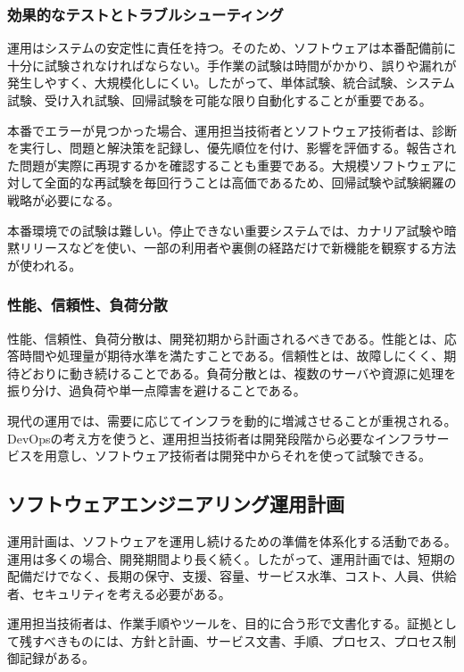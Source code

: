 \documentclass[a4paper,11pt]{ltjsarticle}
\numberwithin{figure}{section}
\numberwithin{table}{section}
\begin{document}
\subsubsection{効果的なテストとトラブルシューティング}

運用はシステムの安定性に責任を持つ。そのため、ソフトウェアは本番配備前に十分に試験されなければならない。手作業の試験は時間がかかり、誤りや漏れが発生しやすく、大規模化しにくい。したがって、単体試験、統合試験、システム試験、受け入れ試験、回帰試験を可能な限り自動化することが重要である。

本番でエラーが見つかった場合、運用担当技術者とソフトウェア技術者は、診断を実行し、問題と解決策を記録し、優先順位を付け、影響を評価する。報告された問題が実際に再現するかを確認することも重要である。大規模ソフトウェアに対して全面的な再試験を毎回行うことは高価であるため、回帰試験や試験網羅の戦略が必要になる。

本番環境での試験は難しい。停止できない重要システムでは、カナリア試験や暗黙リリースなどを使い、一部の利用者や裏側の経路だけで新機能を観察する方法が使われる。

\subsubsection{性能、信頼性、負荷分散}

性能、信頼性、負荷分散は、開発初期から計画されるべきである。性能とは、応答時間や処理量が期待水準を満たすことである。信頼性とは、故障しにくく、期待どおりに動き続けることである。負荷分散とは、複数のサーバや資源に処理を振り分け、過負荷や単一点障害を避けることである。

現代の運用では、需要に応じてインフラを動的に増減させることが重視される。DevOpsの考え方を使うと、運用担当技術者は開発段階から必要なインフラサービスを用意し、ソフトウェア技術者は開発中からそれを使って試験できる。

\subsection{ソフトウェアエンジニアリング運用計画}

運用計画は、ソフトウェアを運用し続けるための準備を体系化する活動である。運用は多くの場合、開発期間より長く続く。したがって、運用計画では、短期の配備だけでなく、長期の保守、支援、容量、サービス水準、コスト、人員、供給者、セキュリティを考える必要がある。

運用担当技術者は、作業手順やツールを、目的に合う形で文書化する。証拠として残すべきものには、方針と計画、サービス文書、手順、プロセス、プロセス制御記録がある。
\end{document}
